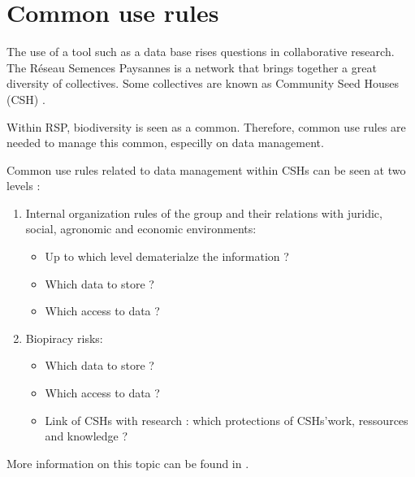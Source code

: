 \section{Common use rules}

The use of a tool such as a data base rises questions in collaborative research.
The R\'eseau Semences Paysannes is a network that brings together a great diversity of collectives.
Some collectives are known as Community Seed Houses (CSH) \citep{rsp_msp_2014}.

Within RSP, biodiversity is seen as a common.
Therefore, common use rules are needed to manage this common, especilly on data management.

Common use rules related to data management within CSHs can be seen at two levels :

\begin{enumerate}

\item Internal organization rules of the group and their relations with juridic, social, agronomic and economic environments:
	\begin{itemize}
	\item Up to which level dematerialze the information ?
	\item Which data to store ?
	\item Which access to data ?
	\end{itemize}

\item Biopiracy risks:
	\begin{itemize}
	\item Which data to store ?
	\item Which access to data ?
	\item Link of CSHs with research : which protections of CSHs'work, ressources and knowledge ?
	\end{itemize}

\end{enumerate}

More information on this topic can be found in \citet{rsp_element_2015}.




